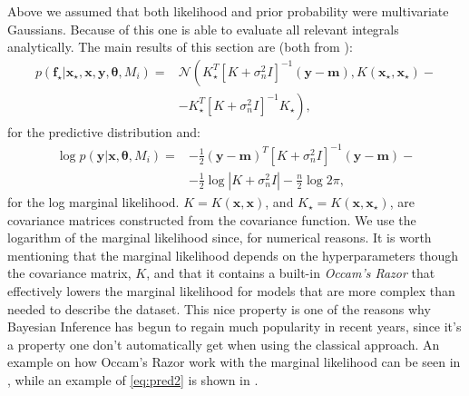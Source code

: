 \documentclass[a4paper,11pt,article,oneside]{memoir}
\begin{document}
Above we assumed that both likelihood and prior probability were multivariate Gaussians. Because of this one is able to evaluate all relevant integrals analytically. The main results of this section are (both from \cite[Chapter~2]{rasmussen2006}):
%
\begin{align}
p( \mathbf{f}_\star|\mathbf{x}_\star,\mathbf{x},\mathbf{y},\boldsymbol{\theta},M_i ) = & \mathcal{N}\left( K_\star^T\left[K + \sigma_n^2 I \right]^{-1}(\mathbf{y}-\mathbf{m}), K(\mathbf{x}_\star,\mathbf{x}_\star) - \right. \nonumber \\
&- \left. K_\star^T\left[K + \sigma_n^2 I \right]^{-1}K_\star \right),
\label{eq:pred2}
\end{align}
%
for the predictive distribution and:
%
\begin{align}
\log p(\mathbf{y}|\mathbf{x},\boldsymbol{\theta},M_i) =& -\frac{1}{2}(\mathbf{y}-\mathbf{m})^T\left[K + \sigma_n^2 I \right]^{-1}(\mathbf{y}-\mathbf{m}) - \nonumber \\ 
&- \frac{1}{2}\log \left| K + \sigma_n^2 I \right| - \frac{n}{2}\log 2\pi,
\label{eq:loglike}
\end{align}
%
for the log marginal likelihood. $K = K(\mathbf{x},\mathbf{x})$, and $K_\star = K(\mathbf{x},\mathbf{x}_\star)$, are covariance matrices constructed from the covariance function. We use the logarithm of the marginal likelihood since, for numerical reasons. It is worth mentioning that the marginal likelihood depends on the hyperparameters though the covariance matrix, $K$, and that it contains a built-in \emph{Occam's Razor} that effectively lowers the marginal likelihood for models that are more complex than needed to describe the dataset. This nice property is one of the reasons why Bayesian Inference has begun to regain much popularity in recent years, since it's a property one don't automatically get when using the classical approach. An example on how Occam's Razor work with the marginal likelihood can be seen in \cite[Chapter~5]{rasmussen2006}, while an example of \eqref{eq:pred2} is shown in .
\end{document}

